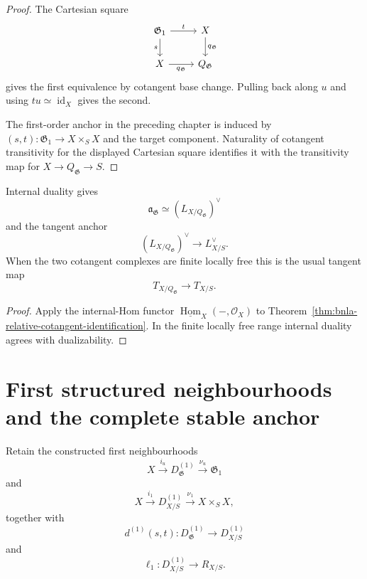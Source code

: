 \begin{proof}
The Cartesian square
\[
\begin{tikzcd}
\mathfrak G_1 \arrow[r,"t"] \arrow[d,"s"'] &
X \arrow[d,"q_{\mathfrak G}"]\\
X \arrow[r,"q_{\mathfrak G}"'] &
Q_{\mathfrak G}
\end{tikzcd}
\]
gives the first equivalence by cotangent base change.  Pulling back along
$u$ and using $tu\simeq\operatorname{id}_X$ gives the second.

The first-order anchor in the preceding chapter is induced by
$(s,t):\mathfrak G_1\to X\times_SX$ and the target component.  Naturality of
cotangent transitivity for the displayed Cartesian square identifies it with
the transitivity map for $X\to Q_{\mathfrak G}\to S$.
\end{proof}

\begin{corollary}
\label{cor:bnla-relative-tangent-identification}
Internal duality gives
\[
    \mathfrak a_{\mathfrak G}
    \simeq
    \left(L_{X/Q_{\mathfrak G}}\right)^\vee
\]
and the tangent anchor
\[
    \left(L_{X/Q_{\mathfrak G}}\right)^\vee
    \longrightarrow
    L_{X/S}^\vee.
\]
When the two cotangent complexes are finite locally free this is the usual
tangent map
\[
    T_{X/Q_{\mathfrak G}}
    \longrightarrow
    T_{X/S}.
\]
\end{corollary}

\begin{proof}
Apply the internal-Hom functor
$\underline{\operatorname{Hom}}_X(-,\mathcal O_X)$ to
Theorem~\ref{thm:bnla-relative-cotangent-identification}.  In the finite
locally free range internal duality agrees with dualizability.
\end{proof}

\section{First structured neighbourhoods and the complete stable anchor}
\label{sec:bnla-first-order-vs-stable}

Retain the constructed first neighbourhoods
\[
    X\xrightarrow{i_u}D^{(1)}_{\mathfrak G}
    \xrightarrow{\nu_u}\mathfrak G_1
\]
and
\[
    X\xrightarrow{i_1}D^{(1)}_{X/S}
    \xrightarrow{\nu_1}X\times_SX,
\]
together with
\[
    d^{(1)}(s,t):
    D^{(1)}_{\mathfrak G}
    \longrightarrow
    D^{(1)}_{X/S}
\]
and
\[
    \ell_1:
    D^{(1)}_{X/S}
    \longrightarrow
    R_{X/S}.
\]


